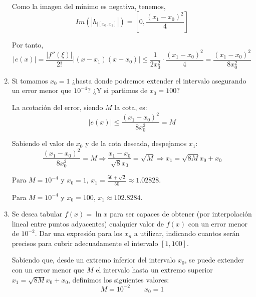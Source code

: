 \begin{ejercicio}
\begin{enumerate}
        Como la imagen del mínimo es negativa, tenemos,
        \begin{equation*}
            Im \left(\left|h_{\left|[x_0,x_1] \right.}\right| \right) = \left[0, \frac{(x_1-x_0)^2}{4}\right]
        \end{equation*}

        Por tanto,
        \begin{equation*}
            |e(x)| = \frac{\left|f''(\xi)\right|}{2!}\left|(x-x_1)(x-x_0)\right|
            \leq
            \frac{1}{2x_0^2}\cdot \frac{(x_1-x_0)^2}{4}
             = \frac{(x_1-x_0)^2}{8x_0^2}
        \end{equation*}

        \item Si tomamos $x_0 = 1$ ¿hasta donde podremos extender el intervalo asegurando un error menor que $10^{-4}$? ¿Y si partimos de $x_0 = 100$?

        La acotación del error, siendo $M$ la cota, es:
        \begin{equation*}
            |e(x)|\leq \frac{(x_1-x_0)^2}{8x_0^2} = M
        \end{equation*}

        Sabiendo el valor de $x_0$ y de la cota deseada, despejamos $x_1$:
        \begin{equation*}
            \frac{(x_1-x_0)^2}{8x_0^2} = M
            \Longrightarrow
            \frac{x_1-x_0}{\sqrt{8}x_0} = \sqrt{M}
            \Longrightarrow
            x_1 = \sqrt{8M}x_0 + x_0
        \end{equation*}

        Para $M=10^{-4}$ y $x_0=1$, $x_1=\frac{50+\sqrt{2}}{50}\approx 1.02828$.

        Para $M=10^{-4}$ y $x_0=100$, $x_1\approx102.8284$.
        
        \item Se desea tabular $f(x) = \ln x$ para ser capaces de obtener (por interpolación lineal entre puntos adyacentes) cualquier valor de $f(x)$ con un error menor de $10^{-2}$. Dar una expresión para los $x_n$ a utilizar, indicando cuantos serán precisos para cubrir adecuadamente el intervalo $[1,100]$.

        Sabiendo que, desde un extremo inferior del intervalo $x_0$, se puede extender con un error menor que $M$ el intervalo hasta un extremo superior $x_1 = \sqrt{8M}x_0 + x_0$, definimos los siguientes valores:
        \begin{equation*}
            M = 10^{-2} \qquad x_0 = 1
        \end{equation*}


\end{enumerate}
\end{ejercicio}
